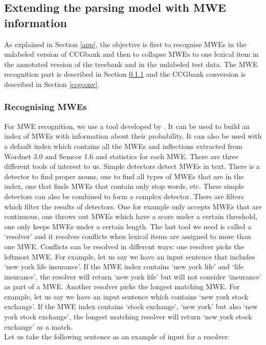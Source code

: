 \documentclass[output=paper]{LSP/langsci}
\begin{document}
\subsection{Extending the parsing model with MWE information}
\label{extension}

\indent As explained in Section \ref{app}, the objective is first to recognise MWEs in the unlabeled version of CCGbank and then to collapse MWEs to one lexical item in the annotated version of the treebank and in the unlabeled test data. The MWE recognition part is described in Section \ref{mwerec} and the CCGbank conversion is described in Section \ref{ccgconv}. 

\subsubsection{Recognising MWEs}
\label{mwerec}
\indent For MWE recognition, we use a tool developed by \citet{finlayson2011}. It can be used to build an index of MWEs with information about their probability. It can also be used with a default index which contains all the MWEs and inflections extracted from Wordnet 3.0 and Semcor 1.6 and statistics for each MWE. There are three different tools of interest to us. Simple detectors detect MWEs in text. There is a detector to find proper nouns, one to find all types of MWEs that are in the index, one that finds MWEs that contain only stop words, etc. These simple detectors can also be combined to form a complex detector. There are filters which filter the results of detectors. One for example only accepts MWEs that are continuous, one throws out MWEs which have a score under a certain threshold, one only keeps MWEs under a certain length. The last tool we need is called a `resolver' and it resolves conflicts when lexical items are assigned to more than one MWE. Conflicts can be resolved in different ways: one resolver picks the leftmost MWE. For example, let us say we have an input sentence that includes `new york life insurance'. If the MWE index contains `new york life' and `life insurance', the resolver will return `new york life' but will not consider `insurance' as part of a MWE. Another resolver picks the longest matching MWE. For example, let us say we have an input sentence which contains `new york stock exchange'. If the MWE index contains `stock exchange', `new york' but also `new york stock exchange', the longest matching resolver will return `new york stock exchange' as a match. \\
\indent Let us take the following sentence as an example of input for a resolver:
\end{document}
